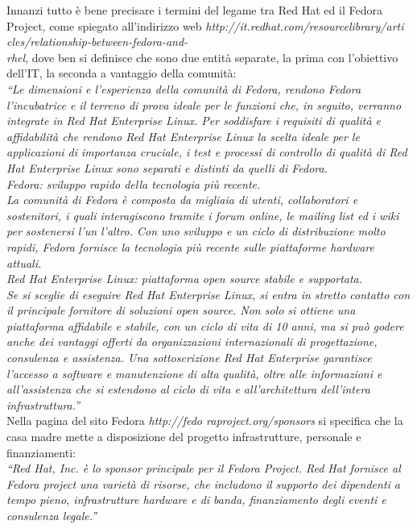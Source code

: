 Innanzi tutto è bene precisare i termini del legame tra Red Hat ed il Fedora Project, come spiegato all'indirizzo web {\itshape http://it.redhat.com/resourcelibrary/arti cles/relationship-between-fedora-and-\\ rhel}, dove ben si definisce che sono due entità separate, la prima con l'obiettivo dell'IT, la seconda a vantaggio della comunità:\\
{\itshape ``Le dimensioni e l'esperienza della comunità di Fedora, rendono Fedora l'incubatrice e il terreno di prova ideale per le funzioni che, in seguito, verranno integrate in Red Hat Enterprise Linux. Per soddisfare i requisiti di qualità e affidabilità che rendono Red Hat Enterprise Linux la scelta ideale per le applicazioni di importanza cruciale, i test e processi di controllo di qualità di Red Hat Enterprise Linux sono separati e distinti da quelli di Fedora.\\

Fedora: sviluppo rapido della tecnologia più recente.\\

La comunità di Fedora è composta da migliaia di utenti, collaboratori e sostenitori, i quali interagiscono tramite i forum online, le mailing list ed i wiki per sostenersi l'un l'altro. Con uno sviluppo e un ciclo di distribuzione molto rapidi, Fedora fornisce la tecnologia più recente sulle piattaforme hardware attuali.\\

Red Hat Enterprise Linux: piattaforma open source stabile e supportata.\\

Se si sceglie di eseguire Red Hat Enterprise Linux, si entra in stretto contatto con il principale fornitore di soluzioni open source. Non solo si ottiene una piattaforma affidabile e stabile, con un ciclo di vita di 10 anni, ma si può godere anche dei vantaggi offerti da organizzazioni internazionali di progettazione, consulenza e assistenza. Una sottoscrizione Red Hat Enterprise garantisce l'accesso a software e manutenzione di alta qualità, oltre alle informazioni e all'assistenza che si estendono al ciclo di vita e all'architettura dell'intera infrastruttura.''} \\

Nella pagina del sito Fedora {\itshape http://fedo raproject.org/sponsors} si specifica che la casa madre mette a disposizione del progetto infrastrutture, personale e finanziamenti:\\
{\itshape ``Red Hat, Inc. è lo sponsor principale per il Fedora Project. Red Hat fornisce al Fedora project una varietà di risorse, che includono il supporto dei dipendenti a tempo pieno, infrastrutture hardware e di banda, finanziamento degli eventi e consulenza legale.''}\\

